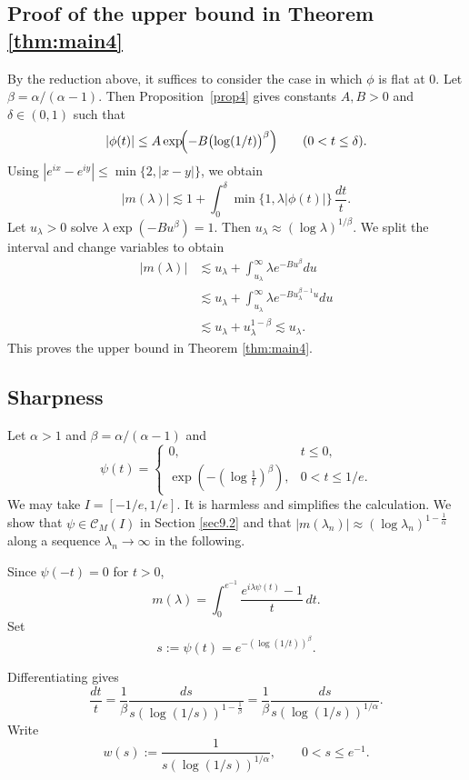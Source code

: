 \documentclass[11pt]{amsart}
\newcommand{\la}{\lambda}
\newcommand{\ls}{\lesssim}
\newcommand{\1}{{\rm 1\hspace*{-0.4ex}%
			\rule{0.1ex}{1.52ex}\hspace*{0.2ex}}}
\numberwithin{equation}{section}
\begin{document}
\subsection{Proof of the upper bound in Theorem \ref{thm:main4}}
By the reduction above, it suffices to consider the
case in which \(\phi\) is flat at \(0\). Let $\beta=\alpha/(\alpha-1)$. Then Proposition~\ref{prop4} gives
constants \(A,B>0\) and \(\delta\in(0,1)\) such that
\begin{equation}\label{eq:flat-small}
	|\phi(t)|\le A\exp\!\Bigl(-B\bigl(\log(1/t)\bigr)^{\beta}\Bigr)
	\qquad (0<t\le \delta).
\end{equation}
Using \(|e^{ix}-e^{iy}|\le \min\{2,|x-y|\}\), we obtain
\[
|m(\lambda)|
\ls 1+\int_0^\delta \min\{1,\lambda|\phi(t)|\}\,\frac{dt}{t}.
\]
Let $u_\la>0$ solve $\la\exp(-Bu^\beta)=1$. Then $u_\la\approx (\log\la)^{1/\beta}$. We split the interval and change variables to obtain
\begin{align*}
|m(\la)| 
&\ls u_\la+ \int_{u_\la}^\infty \la e^{-Bu^\beta}du\\
&\ls u_\la+\int_{u_\la}^\infty \la e^{-Bu_\la^{\beta-1}u}du\\
&\ls u_\la+u_\la^{1-\beta}\ls u_\la.
\end{align*}
This proves the upper bound in Theorem \ref{thm:main4}.


\subsection{Sharpness}\label{7sharp}  
Let $\alpha>1$ and $\beta=\alpha/(\alpha-1)$ and 
\[\psi(t)=\begin{cases}
	0,& t\le 0,\\[1mm]
	\exp(-(\log\frac1{t})^{\beta}),& 0<t\le1/e.
\end{cases}\]
We may take $I=[-1/e,1/e]$. It is harmless and simplifies the calculation.
We show that $\psi\in \mathcal{C}_M(I)$ in Section \ref{sec9.2}
 and that $|m(\lambda_n)| \approx (\log\la_n)^{1-\frac1\alpha}$
along a sequence $\lambda_n\to\infty$ in the following.

Since $\psi(-t)=0$ for $t>0$,
\[
m(\lambda)=\int_0^{e^{-1}}\frac{e^{i\lambda\psi(t)}-1}{t}\,dt.
\]
Set
\[
s:=\psi(t)=e^{-(\log(1/t))^\beta}.
\]

Differentiating gives
\[
\frac{dt}{t}
=
\frac1\beta \frac{ds}{s(\log(1/s))^{1-\frac1\beta}}
=
\frac1\beta \frac{ds}{s(\log(1/s))^{1/\alpha}}.
\]
Write
\[
w(s):=\frac{1}{s(\log(1/s))^{1/\alpha}},
\qquad 0<s\le e^{-1}.
\]
\end{document}
